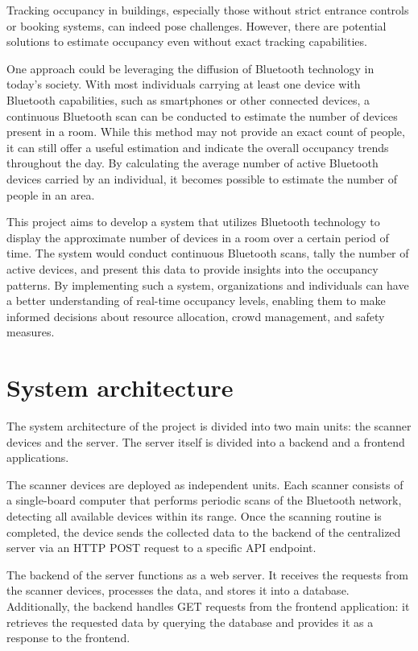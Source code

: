 \documentclass[a4paper, 11pt]{article}
\begin{document}
Tracking occupancy in buildings, especially those without strict entrance controls or booking systems, can indeed pose challenges. However, there are potential solutions to estimate occupancy even without exact tracking capabilities.

One approach could be leveraging the diffusion of Bluetooth technology in today's society. With most individuals carrying at least one device with Bluetooth capabilities, such as smartphones or other connected devices, a continuous Bluetooth scan can be conducted to estimate the number of devices present in a room. While this method may not provide an exact count of people, it can still offer a useful estimation and indicate the overall occupancy trends throughout the day. By calculating the average number of active Bluetooth devices carried by an individual, it becomes possible to estimate the number of people in an area. 

This project aims to develop a system that utilizes Bluetooth technology to display the approximate number of devices in a room over a certain period of time. The system would conduct continuous Bluetooth scans, tally the number of active devices, and present this data to provide insights into the occupancy patterns. By implementing such a system, organizations and individuals can have a better understanding of real-time occupancy levels, enabling them to make informed decisions about resource allocation, crowd management, and safety measures.

\section{System architecture}
The system architecture of the project is divided into two main units: the scanner devices and the server. The server itself is divided into a backend and a frontend applications.

The scanner devices are deployed as independent units. Each scanner consists of a single-board computer that performs periodic scans of the Bluetooth network, detecting all available devices within its range. Once the scanning routine is completed, the device sends the collected data to the backend of the centralized server via an HTTP POST request to a specific API endpoint.

The backend of the server functions as a web server. It receives the requests from the scanner devices, processes the data, and stores it into a database. Additionally, the backend handles GET requests from the frontend application: it retrieves the requested data by querying the database and provides it as a response to the frontend.
\end{document}
